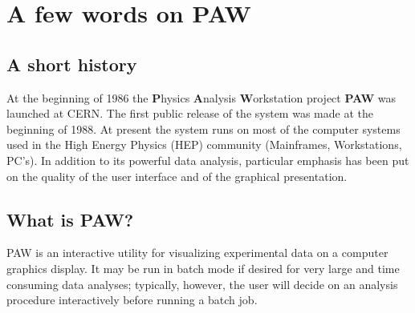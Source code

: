 
\chapter{A few words on PAW}
\label{sec:intro}
 
\section{A short history}

At the beginning of 1986 the {\bf P}hysics {\bf A}nalysis {\bf W}orkstation 
project {\bf PAW} was launched at CERN. The first public release of the system 
was made at the beginning of 1988. At present the system runs on most of the 
computer systems used in the High Energy Physics (HEP) community (Mainframes, 
Workstations, PC's). In addition to its powerful data analysis, particular 
emphasis has been put on the quality of the user interface and of the graphical
presentation.
 
\section{What is PAW?}
 
PAW is an interactive utility for visualizing experimental data on a computer 
graphics display.   It may be run in batch mode
if desired for very large and time consuming data analyses; typically, however,
the user will decide on an analysis procedure interactively before running a 
batch job.
 
